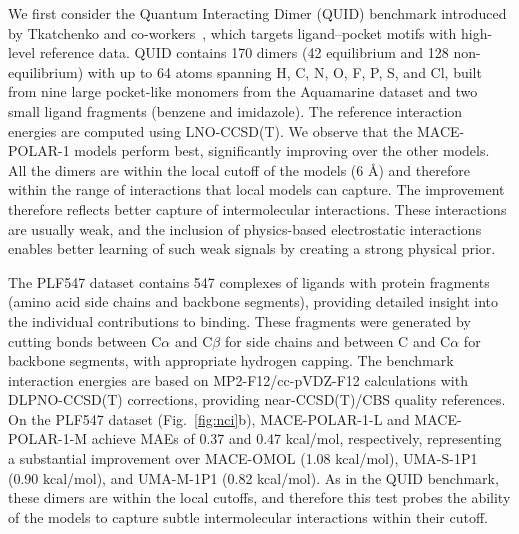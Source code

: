 \documentclass[aps,%
superscriptaddress,
 amsmath,amssymb,
floatfix,
twocolumn
]{revtex4-2}
\newcommand{\MOMOL}{MACE-OMOL }
\newcommand{\MFP}{MACE-POLAR-1 }
\newcommand{\MFPM}{MACE-POLAR-1-M }
\newcommand{\MFPL}{MACE-POLAR-1-L }
\newcommand{\UMAS}{UMA-S-1P1 }
\newcommand{\UMAM}{UMA-M-1P1 }
\begin{document}
We first consider the Quantum Interacting Dimer (QUID) benchmark introduced by Tkatchenko and co-workers~\cite{puleva2025quid}, which targets ligand--pocket motifs with high-level reference data. QUID contains 170 dimers (42 equilibrium and 128 non-equilibrium) with up to 64 atoms spanning H, C, N, O, F, P, S, and Cl, built from nine large pocket-like monomers from the Aquamarine dataset and two small ligand fragments (benzene and imidazole). The reference interaction energies are computed using LNO-CCSD(T). We observe that the \MFP models perform best, significantly improving over the other models. All the dimers are within the local cutoff of the models (6 \AA{}) and therefore within the range of interactions that local models can capture. The improvement therefore reflects better capture of intermolecular interactions. These interactions are usually weak, and the inclusion of physics-based electrostatic interactions enables better learning of such weak signals by creating a strong physical prior.

The PLF547 dataset contains 547 complexes of ligands with protein fragments (amino acid side chains and backbone segments), providing detailed insight into the individual contributions to binding. These fragments were generated by cutting bonds between C$\alpha$ and C$\beta$ for side chains and between C and C$\alpha$ for backbone segments, with appropriate hydrogen capping. The benchmark interaction energies are based on MP2-F12/cc-pVDZ-F12 calculations with DLPNO-CCSD(T) corrections, providing near-CCSD(T)/CBS quality references.
On the PLF547 dataset (Fig.~\ref{fig:nci}b), \MFPL and \MFPM achieve MAEs of 0.37 and 0.47 kcal/mol, respectively, representing a substantial improvement over \MOMOL (1.08 kcal/mol), \UMAS (0.90 kcal/mol), and \UMAM (0.82 kcal/mol). As in the QUID benchmark, these dimers are within the local cutoffs, and therefore this test probes the ability of the models to capture subtle intermolecular interactions within their cutoff.
\end{document}
